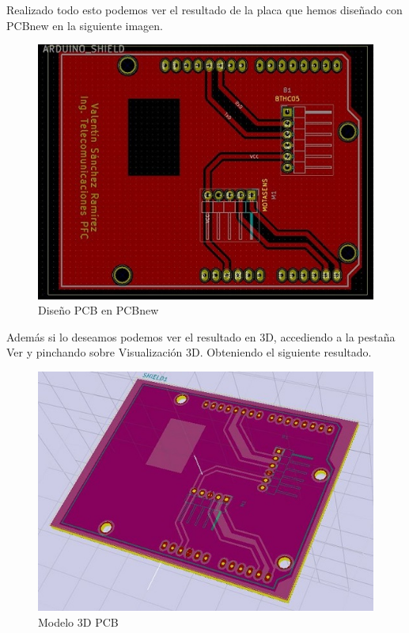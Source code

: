 		\
		\\
		\
		
		Realizado todo esto podemos ver el resultado de la placa que hemos diseñado con PCBnew en la siguiente imagen.
		
		\begin{figure}[h]
			\centering
			\includegraphics{imagenes/DisenoPCB.jpg}
			\caption{Dise\~no PCB en PCBnew}
			\label{contexto:figura}
		\end{figure}
		
		Además si lo deseamos podemos ver el resultado en 3D, accediendo a la pesta\~na Ver y pinchando sobre Visualización 3D. Obteniendo el siguiente resultado.
		
		\begin{figure}[h]
			\centering
			\includegraphics{imagenes/3D.jpg}
			\caption{Modelo 3D PCB}
			\label{contexto:figura}
		\end{figure}
		
